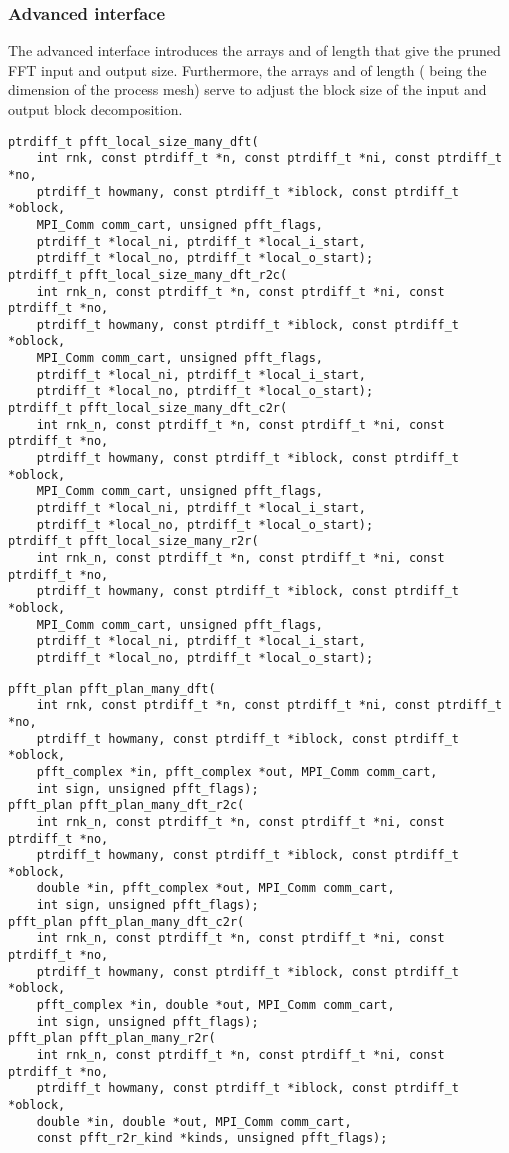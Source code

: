 \subsubsection{Advanced interface}
The advanced interface introduces the arrays  and  of length 
that give the pruned FFT input and output size.
Furthermore, the arrays  and  of length  ( being the dimension of the process mesh)
serve to adjust the block size of the input and output block decomposition.
\begin{lstlisting}
ptrdiff_t pfft_local_size_many_dft(
    int rnk, const ptrdiff_t *n, const ptrdiff_t *ni, const ptrdiff_t *no,
    ptrdiff_t howmany, const ptrdiff_t *iblock, const ptrdiff_t *oblock,
    MPI_Comm comm_cart, unsigned pfft_flags,
    ptrdiff_t *local_ni, ptrdiff_t *local_i_start,
    ptrdiff_t *local_no, ptrdiff_t *local_o_start);
ptrdiff_t pfft_local_size_many_dft_r2c(
    int rnk_n, const ptrdiff_t *n, const ptrdiff_t *ni, const ptrdiff_t *no,
    ptrdiff_t howmany, const ptrdiff_t *iblock, const ptrdiff_t *oblock,
    MPI_Comm comm_cart, unsigned pfft_flags,
    ptrdiff_t *local_ni, ptrdiff_t *local_i_start,
    ptrdiff_t *local_no, ptrdiff_t *local_o_start);
ptrdiff_t pfft_local_size_many_dft_c2r(
    int rnk_n, const ptrdiff_t *n, const ptrdiff_t *ni, const ptrdiff_t *no,
    ptrdiff_t howmany, const ptrdiff_t *iblock, const ptrdiff_t *oblock,
    MPI_Comm comm_cart, unsigned pfft_flags,
    ptrdiff_t *local_ni, ptrdiff_t *local_i_start,
    ptrdiff_t *local_no, ptrdiff_t *local_o_start);
ptrdiff_t pfft_local_size_many_r2r(
    int rnk_n, const ptrdiff_t *n, const ptrdiff_t *ni, const ptrdiff_t *no,
    ptrdiff_t howmany, const ptrdiff_t *iblock, const ptrdiff_t *oblock,
    MPI_Comm comm_cart, unsigned pfft_flags,
    ptrdiff_t *local_ni, ptrdiff_t *local_i_start,
    ptrdiff_t *local_no, ptrdiff_t *local_o_start);
\end{lstlisting}
\begin{lstlisting}
pfft_plan pfft_plan_many_dft(
    int rnk, const ptrdiff_t *n, const ptrdiff_t *ni, const ptrdiff_t *no,
    ptrdiff_t howmany, const ptrdiff_t *iblock, const ptrdiff_t *oblock,
    pfft_complex *in, pfft_complex *out, MPI_Comm comm_cart,
    int sign, unsigned pfft_flags);
pfft_plan pfft_plan_many_dft_r2c(
    int rnk_n, const ptrdiff_t *n, const ptrdiff_t *ni, const ptrdiff_t *no,
    ptrdiff_t howmany, const ptrdiff_t *iblock, const ptrdiff_t *oblock,
    double *in, pfft_complex *out, MPI_Comm comm_cart,
    int sign, unsigned pfft_flags);
pfft_plan pfft_plan_many_dft_c2r(
    int rnk_n, const ptrdiff_t *n, const ptrdiff_t *ni, const ptrdiff_t *no,
    ptrdiff_t howmany, const ptrdiff_t *iblock, const ptrdiff_t *oblock,
    pfft_complex *in, double *out, MPI_Comm comm_cart,
    int sign, unsigned pfft_flags);
pfft_plan pfft_plan_many_r2r(
    int rnk_n, const ptrdiff_t *n, const ptrdiff_t *ni, const ptrdiff_t *no,
    ptrdiff_t howmany, const ptrdiff_t *iblock, const ptrdiff_t *oblock,
    double *in, double *out, MPI_Comm comm_cart,
    const pfft_r2r_kind *kinds, unsigned pfft_flags);
\end{lstlisting}

